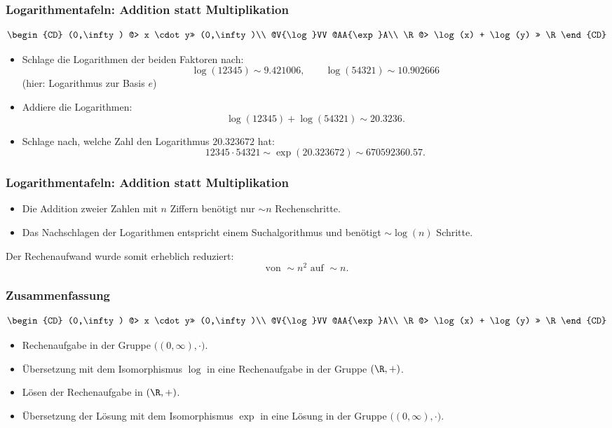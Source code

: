 %
%
\begin{frame}\frametitle{Logarithmentafeln: Addition statt Multiplikation}

	$$
		\begin{CD}
			(0,\infty) @> x \cdot y>> (0,\infty)\\
			@V{\log}VV 	@AA{\exp}A\\
			\R @> \log(x) + \log(y) >> \R
		\end{CD}
	$$
	\pause
	\begin{itemize}
		\item Schlage die Logarithmen der beiden Faktoren nach:
			$$
				\log(12345) \sim 9.421006, \qquad \log(54321) \sim 10.902666
			$$
			(hier: Logarithmus zur Basis $e$) \pause
		\item Addiere die Logarithmen:
			$$
				\log(12345) + \log(54321) \sim 20.3236. 
			$$\pause
		\item Schlage nach, welche Zahl den Logarithmus $20.323672$ hat:
			$$
				12345\cdot 54321 \sim \exp(20.323672) \sim 670592360.57.
			$$
	\end{itemize}

\end{frame}
%
%
\begin{frame}\frametitle{Logarithmentafeln: Addition statt Multiplikation}

	\begin{itemize}
		\item Die Addition zweier Zahlen mit $n$ Ziffern benötigt nur $\sim n$ Rechenschritte.
		\item Das Nachschlagen der Logarithmen entspricht einem Suchalgorithmus und benötigt $\sim \log(n)$ Schritte.
	\end{itemize}
	\pause
	\vfill
	Der Rechenaufwand wurde somit erheblich reduziert:
	$$
		\text{von~} \sim n^2 \text{~auf~} \sim n.
	$$
	
\end{frame}
%
%
\begin{frame}\frametitle{Zusammenfassung}
	
		$$
		\begin{CD}
			(0,\infty) @> x \cdot y>> (0,\infty)\\
			@V{\log}VV 	@AA{\exp}A\\
			\R @> \log(x) + \log(y) >> \R
		\end{CD}
	$$
	
	\begin{itemize}
		\item Rechenaufgabe in der Gruppe $\Big( (0,\infty),\cdot\Big)$.
		\item \"Ubersetzung mit dem Isomorphismus $\log$ in eine Rechenaufgabe in der Gruppe $(\R,+)$.
		\item Lösen der Rechenaufgabe in $(\R,+)$.
		\item \"Ubersetzung der Lösung mit dem Isomorphismus $\exp$ in eine Lösung in der Gruppe $\Big( (0,\infty),\cdot\Big)$.
	\end{itemize}
	
\end{frame}
%

%
